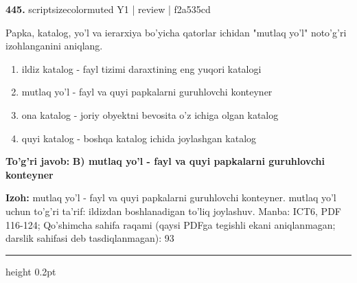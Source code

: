 \documentclass[10pt,a4paper]{article}
\begin{document}
{\bfseries\sffamily\color{ink} 445.} {scriptsizecolor{muted} Y1 | review | f2a535cd}
\par
Papka, katalog, yo'l va ierarxiya bo'yicha qatorlar ichidan "mutlaq yo'l" noto'g'ri izohlanganini aniqlang.
\begin{enumerate}[label=\Alph*),leftmargin=9mm]
\item ildiz katalog - fayl tizimi daraxtining eng yuqori katalogi
\item mutlaq yo'l - fayl va quyi papkalarni guruhlovchi konteyner
\item ona katalog - joriy obyektni bevosita o'z ichiga olgan katalog
\item quyi katalog - boshqa katalog ichida joylashgan katalog
\end{enumerate}
\begin{tcolorbox}[enhanced,breakable,colback=teal!4,colframe=teal!60!black,boxrule=0.45pt,arc=1.2mm,left=2.7mm,right=2.7mm,top=1.8mm,bottom=1.8mm,before skip=2mm,after skip=2mm]
{\bfseries\sffamily\color{teal}To'g'ri javob:} \textbf{B) mutlaq yo'l - fayl va quyi papkalarni guruhlovchi konteyner}
\par\smallskip
{\bfseries Izoh:} mutlaq yo'l - fayl va quyi papkalarni guruhlovchi konteyner. mutlaq yo'l uchun to'g'ri ta'rif: ildizdan boshlanadigan to'liq joylashuv. Manba: ICT6, PDF 116-124; Qo'shimcha sahifa raqami (qaysi PDFga tegishli ekani aniqlanmagan; darslik sahifasi deb tasdiqlanmagan): 93
\end{tcolorbox}
\vspace{2mm}\hrule height 0.2pt\vspace{3mm}
\end{document}
